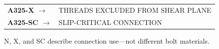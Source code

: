 \documentclass[10pt]{article}
\begin{document}
\begin{minipage}[t]{0.34\textwidth}
\vspace{0pt}
\setlength{\fboxsep}{5pt}

\vspace{5pt}
{\ttfamily\scriptsize
\begin{tabular}{@{}>{\bfseries}l@{\ }p{1.62in}@{}}
A325-X $\rightarrow$ & THREADS EXCLUDED FROM SHEAR PLANE \\[2pt]
A325-SC $\rightarrow$ & SLIP-CRITICAL CONNECTION
\end{tabular}
}

\vspace{5pt}
{\footnotesize N, X, and SC describe connection use---not different bolt materials.}
\end{minipage}
\end{document}
